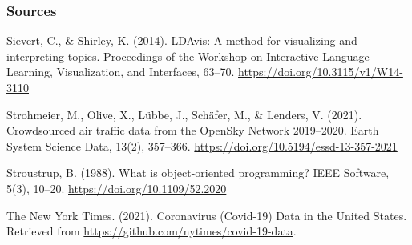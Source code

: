 \documentclass{beamer}
\begin{document}
\begin{frame}
\frametitle{Sources}


Sievert, C., \& Shirley, K. (2014). LDAvis: A method for visualizing and interpreting topics. Proceedings of the Workshop on Interactive Language Learning, Visualization, and Interfaces, 63–70. \url{https://doi.org/10.3115/v1/W14-3110}

\vspace{5px}

Strohmeier, M., Olive, X., Lübbe, J., Schäfer, M., \& Lenders, V. (2021). Crowdsourced air traffic data from the OpenSky Network 2019–2020. Earth System Science Data, 13(2), 357–366. \url{https://doi.org/10.5194/essd-13-357-2021}

\vspace{5px}

Stroustrup, B. (1988). What is object-oriented programming? IEEE Software, 5(3), 10–20. \url{https://doi.org/10.1109/52.2020}

\vspace{5px}

The New York Times. (2021). Coronavirus (Covid-19) Data in the United States. Retrieved from \url{https://github.com/nytimes/covid-19-data}.

\end{frame}
\end{document}

